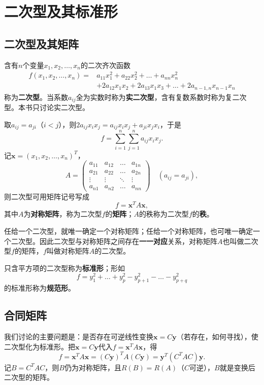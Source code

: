 
\section{二次型及其标准形}

\subsection{二次型及其矩阵}
\begin{definition}[二次型]
含有$n$个变量$x_1,x_2,\dots,x_n$的二次齐次函数
\[
\begin{aligned}
f(x_1,x_2,\dots,x_n)={}&a_{11}x_1^{2}+a_{22}x_2^{2}+\dots+a_{nn}x_n^{2}\\
&+2a_{12}x_1x_2+2a_{13}x_1x_3+\dots+2a_{n-1,n}x_{n-1}x_n
\end{aligned}
\]
称为\textbf{二次型}。当系数$a_{ij}$全为实数时称为\textbf{实二次型}，含有复数系数时称为复二次型。本书只讨论实二次型。
\end{definition}

取$a_{ij}=a_{ji}$（$i<j$），则$2a_{ij}x_ix_j=a_{ij}x_ix_j+a_{ji}x_jx_i$，于是
\[
f=\sum_{i=1}^{n}\sum_{j=1}^{n}a_{ij}x_ix_j .
\]
记$\boldsymbol{x}=(x_1,x_2,\dots,x_n)^{T}$，
\[
A=\begin{pmatrix}
a_{11}&a_{12}&\dots&a_{1n}\\
a_{21}&a_{22}&\dots&a_{2n}\\
\vdots&\vdots&\ddots&\vdots\\
a_{n1}&a_{n2}&\dots&a_{nn}
\end{pmatrix}
\quad(a_{ij}=a_{ji}),
\]
则二次型可用矩阵记号写成
\[
f=\boldsymbol{x}^{T}A\boldsymbol{x},
\]
其中$A$为\textbf{对称矩阵}，称为二次型$f$的\textbf{矩阵}；$A$的秩称为二次型$f$的\textbf{秩}。

任给一个二次型，就唯一确定一个对称矩阵；任给一个对称矩阵，也可唯一确定一个二次型。因此二次型与对称矩阵之间存在\textbf{一一对应}关系，对称矩阵$A$也叫做二次型$f$的矩阵，$f$叫做对称矩阵$A$的二次型。

只含平方项的二次型称为\textbf{标准形}；形如
\[
f=y_1^{2}+\dots+y_p^{2}-y_{p+1}^{2}-\dots-y_{p+q}^{2}
\]
的标准形称为\textbf{规范形}。

\subsection{合同矩阵}
我们讨论的主要问题是：是否存在可逆线性变换$\boldsymbol{x}=C\boldsymbol{y}$（若存在，如何寻找），使二次型化为标准形。把$\boldsymbol{x}=C\boldsymbol{y}$代入$f=\boldsymbol{x}^{T}A\boldsymbol{x}$，得
\[
f=\boldsymbol{x}^{T}A\boldsymbol{x}=(C\boldsymbol{y})^{T}A(C\boldsymbol{y})
=\boldsymbol{y}^{T}(C^{T}AC)\boldsymbol{y}.
\]
记$B=C^{T}AC$，则$B$仍为对称矩阵，且$R(B)=R(A)$（$C$可逆），$B$就是变换后二次型的矩阵。

